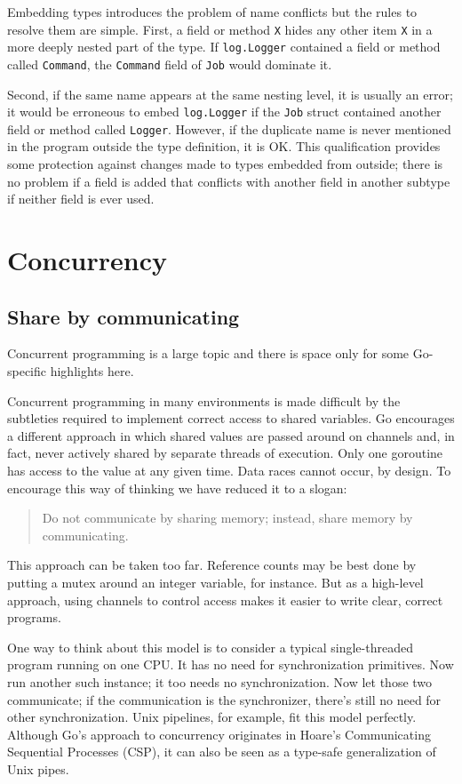 Embedding types introduces the problem of name conflicts but the rules
to resolve them are simple. First, a field or method \texttt{X} hides
any other item \texttt{X} in a more deeply nested part of the type. If
\texttt{log.Logger} contained a field or method called \texttt{Command},
the \texttt{Command} field of \texttt{Job} would dominate it.

Second, if the same name appears at the same nesting level, it is
usually an error; it would be erroneous to embed \texttt{log.Logger} if
the \texttt{Job} struct contained another field or method called
\texttt{Logger}. However, if the duplicate name is never mentioned in
the program outside the type definition, it is OK. This qualification
provides some protection against changes made to types embedded from
outside; there is no problem if a field is added that conflicts with
another field in another subtype if neither field is ever used.

\section*{Concurrency}

\subsection*{Share by communicating}

Concurrent programming is a large topic and there is space only for some
Go-specific highlights here.

Concurrent programming in many environments is made difficult by the
subtleties required to implement correct access to shared variables. Go
encourages a different approach in which shared values are passed around
on channels and, in fact, never actively shared by separate threads of
execution. Only one goroutine has access to the value at any given time.
Data races cannot occur, by design. To encourage this way of thinking we
have reduced it to a slogan:

\begin{quote}
Do not communicate by sharing memory; instead, share memory by
communicating.
\end{quote}

This approach can be taken too far. Reference counts may be best done by
putting a mutex around an integer variable, for instance. But as a
high-level approach, using channels to control access makes it easier to
write clear, correct programs.

One way to think about this model is to consider a typical
single-threaded program running on one CPU. It has no need for
synchronization primitives. Now run another such instance; it too needs
no synchronization. Now let those two communicate; if the communication
is the synchronizer, there's still no need for other synchronization.
Unix pipelines, for example, fit this model perfectly. Although Go's
approach to concurrency originates in Hoare's Communicating Sequential
Processes (CSP), it can also be seen as a type-safe generalization of
Unix pipes.

